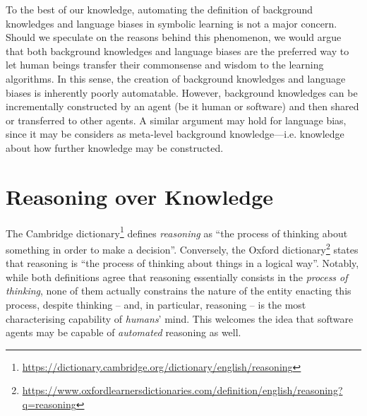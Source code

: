 \documentclass[12pt,a4paper,openright,twoside]{book}
\begin{document}
To the best of our knowledge, automating the definition of background knowledges and language biases in symbolic learning is not a major concern.
%
Should we speculate on the reasons behind this phenomenon, we would argue that both background knowledges and language biases are the preferred way to let human beings transfer their commonsense and wisdom to the learning algorithms.
%
In this sense, the creation of background knowledges and language biases is inherently poorly automatable.
%
However, background knowledges can be incrementally constructed by an agent (be it human or software) and then shared or transferred to other agents.
%
A similar argument may hold for language bias, since it may be considers as meta-level background knowledge---i.e. knowledge about how further knowledge may be constructed.



\chapter{Reasoning over Knowledge}
\label{chap:reasoning}

The Cambridge dictionary\footnote{\url{https://dictionary.cambridge.org/dictionary/english/reasoning}} defines \emph{reasoning} as
%
``the process of thinking about something in order to make a decision''.
%
Conversely, the Oxford dictionary\footnote{\url{https://www.oxfordlearnersdictionaries.com/definition/english/reasoning?q=reasoning}} states that reasoning is
%
``the process of thinking about things in a logical way''.
%
Notably, while both definitions agree that reasoning essentially consists in the \emph{process of thinking}, none of them actually constrains the nature of the entity enacting this process, despite thinking -- and, in particular, reasoning -- is the most characterising capability of \emph{humans}' mind.
%
This welcomes the idea that software agents may be capable of \emph{automated} reasoning as well.
\end{document}
